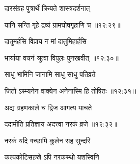 {\devanagarifont दारसंग्रह पुत्रार्थे क्रियते शास्त्रदर्शनात् \thinspace{\dandab} \dontdisplaylinenum }%


{\devanagarifont यानि सन्ति गृहे द्रव्यं ग्रामघोषगृहाणि च {॥१२:२९॥} \veg\dontdisplaylinenum }%
 
{\devanagarifont दातुमर्हसि विप्राय न मां दातुमिहार्हसि \thinspace{\dandab} \dontdisplaylinenum }%
 

{\devanagarifont भार्याया वचनं श्रुत्वा विपुलः पुनरब्रवीत् {॥१२:३०॥} \veg\dontdisplaylinenum }%

{\devanagarifont साधु भामिनि जानामि साधु साधु पतिव्रते \thinspace{\dandab} \dontdisplaylinenum }%


{\devanagarifont जितो ऽस्म्यनेन वाक्येन अनेनास्मि हि तोषितः {॥१२:३१॥} \veg\dontdisplaylinenum }%

{\devanagarifont अद्य ग्रहणकाले च द्विज आगत्य याचते \thinspace{\dandab} \dontdisplaylinenum }%
 

{\devanagarifont ददामीति प्रतिज्ञाय अदत्त्वा नरकं व्रजे {॥१२:३२॥} \veg\dontdisplaylinenum }%

{\devanagarifont नरकं यदि गच्छामि कुलेन सह सुन्दरि \thinspace{\dandab} \dontdisplaylinenum }%

{\devanagarifont कल्पकोटिसहस्रे ऽपि नरकस्थो यशस्विनि  \danda\dontdisplaylinenum }%

